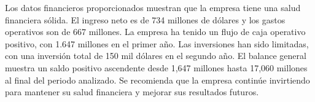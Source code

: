 

Los datos financieros proporcionados muestran que la empresa tiene una salud financiera sólida. El ingreso neto es de 734 millones de dólares y los gastos operativos son de 667 millones. La empresa ha tenido un flujo de caja operativo positivo, con 1.647 millones en el primer año. Las inversiones han sido limitadas, con una inversión total de 150 mil dólares en el segundo año. El balance general muestra un saldo positivo ascendente desde 1,647 millones hasta 17,060 millones al final del periodo analizado. Se recomienda que la empresa continúe invirtiendo para mantener su salud financiera y mejorar sus resultados futuros.